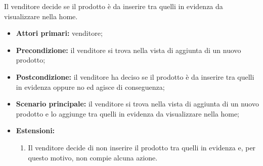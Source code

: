 Il venditore decide se il prodotto è da inserire tra quelli in evidenza da visualizzare nella home.
\begin{itemize}
	\item \textbf{Attori primari:} venditore;
    \item \textbf{Precondizione:} il venditore si trova nella vista di aggiunta di un nuovo prodotto;
    \item \textbf{Postcondizione:} il venditore ha deciso se il prodotto è da inserire tra quelli in evidenza oppure no ed agisce di conseguenza;
    \item \textbf{Scenario principale:} il venditore si trova nella vista di aggiunta di un nuovo prodotto e lo aggiunge tra quelli in evidenza da visualizzare nella home;
    \item \textbf{Estensioni:}
    \begin{enumerate}
    	\item Il venditore decide di non inserire il prodotto tra quelli in evidenza e, per questo motivo, non compie alcuna azione.
    \end{enumerate}
\end{itemize}



